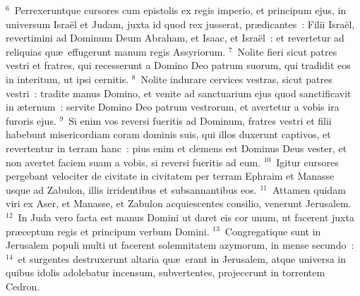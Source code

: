 ${}^{6}$~Perrexeruntque cursores cum epistolis ex regis imperio, et principum ejus, in universum Isra\"el et Judam, juxta id quod rex jusserat, pr\ae dicantes~: Filii Isra\"el, revertimini ad Dominum Deum Abraham, et Isaac, et Isra\"el~: et revertetur ad reliquias qu\ae\ effugerunt manum regis Assyriorum.
${}^{7}$~Nolite fieri sicut patres vestri et fratres, qui recesserunt a Domino Deo patrum suorum, qui tradidit eos in interitum, ut ipsi cernitis.
${}^{8}$~Nolite indurare cervices vestras, sicut patres vestri~: tradite manus Domino, et venite ad sanctuarium ejus quod sanctificavit in \ae ternum~: servite Domino Deo patrum vestrorum, et avertetur a vobis ira furoris ejus.
${}^{9}$~Si enim vos reversi fueritis ad Dominum, fratres vestri et filii habebunt misericordiam coram dominis suis, qui illos duxerunt captivos, et revertentur in terram hanc~: pius enim et clemens est Dominus Deus vester, et non avertet faciem suam a vobis, si reversi fueritis ad eum.
${}^{10}$~Igitur cursores pergebant velociter de civitate in civitatem per terram Ephraim et Manasse usque ad Zabulon, illis irridentibus et subsannantibus eos.
${}^{11}$~Attamen quidam viri ex Aser, et Manasse, et Zabulon acquiescentes consilio, venerunt Jerusalem.
${}^{12}$~In Juda vero facta est manus Domini ut daret eis cor unum, ut facerent juxta pr\ae ceptum regis et principum verbum Domini.
${}^{13}$~Congregatique sunt in Jerusalem populi multi ut facerent solemnitatem azymorum, in mense secundo~:
${}^{14}$~et surgentes destruxerunt altaria qu\ae\ erant in Jerusalem, atque universa in quibus idolis adolebatur incensum, subvertentes, projecerunt in torrentem Cedron.


